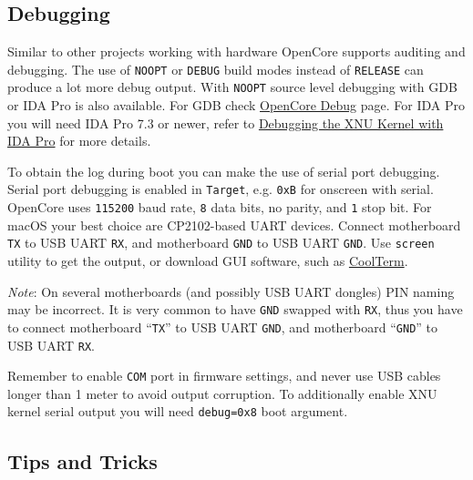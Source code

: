 \documentclass[]{article}
\begin{document}
\subsection{Debugging}\label{troubleshootingdebug}

Similar to other projects working with hardware OpenCore supports auditing and debugging.
The use of \texttt{NOOPT} or \texttt{DEBUG} build modes instead of \texttt{RELEASE}
can produce a lot more debug output. With \texttt{NOOPT} source level debugging with
GDB or IDA Pro is also available. For GDB check
\href{https://github.com/acidanthera/OpenCorePkg/tree/master/Debug}{OpenCore Debug}
page. For IDA Pro you will need IDA Pro 7.3 or newer, refer to
\href{https://www.hex-rays.com/products/ida/support/tutorials/index.shtml}{Debugging the XNU Kernel with IDA Pro}
for more details.

To obtain the log during boot you can make the use of serial port debugging. Serial port
debugging is enabled in \texttt{Target}, e.g. \texttt{0xB} for onscreen with serial. OpenCore
uses \texttt{115200} baud rate, \texttt{8} data bits, no parity, and \texttt{1} stop bit.
For macOS your best choice are CP2102-based UART devices. Connect motherboard \texttt{TX}
to USB UART \texttt{RX}, and motherboard \texttt{GND} to USB UART \texttt{GND}. Use
\texttt{screen} utility to get the output, or download GUI software, such as
\href{https://freeware.the-meiers.org}{CoolTerm}.

\emph{Note}: On several motherboards (and possibly USB UART dongles) PIN naming may be
incorrect. It is very common to have \texttt{GND} swapped with \texttt{RX}, thus you have
to connect motherboard ``\texttt{TX}'' to USB UART \texttt{GND}, and motherboard ``\texttt{GND}''
to USB UART \texttt{RX}.

Remember to enable \texttt{COM} port in firmware settings, and never use USB cables longer
than 1 meter to avoid output corruption. To additionally enable XNU kernel serial output
you will need \texttt{debug=0x8} boot argument.

\subsection{Tips and Tricks}\label{troubleshootingtricks}
\end{document}
